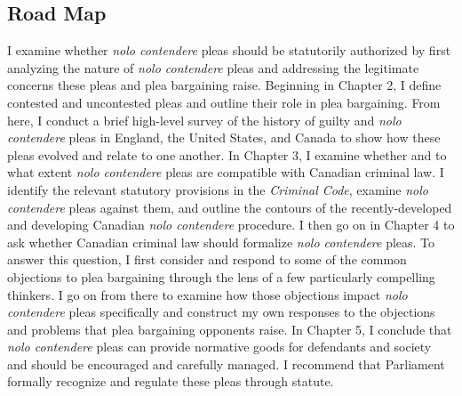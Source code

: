 \subsection{Road Map}

I examine whether \textit{nolo contendere} pleas should be statutorily authorized by first analyzing the nature of \textit{nolo contendere} pleas and addressing the legitimate concerns these pleas and plea bargaining raise. Beginning in Chapter 2, I define contested and uncontested pleas and outline their role in plea bargaining. From here, I conduct a brief high-level survey of the history of guilty and \textit{nolo contendere} pleas in England, the United States, and Canada to show how these pleas evolved and relate to one another. In Chapter 3, I examine whether and to what extent \textit{nolo contendere} pleas are compatible with Canadian criminal law. I identify the relevant statutory provisions in the \textit{Criminal Code}, examine \textit{nolo contendere} pleas against them, and outline the contours of the recently-developed and developing Canadian \textit{nolo contendere} procedure. I then go on in Chapter 4 to ask whether Canadian criminal law should formalize \textit{nolo contendere} pleas. To answer this question, I first consider and respond to some of the common objections to plea bargaining through the lens of a few particularly compelling thinkers. I go on from there to examine how those objections impact \textit{nolo contendere} pleas specifically and construct my own responses to the objections and problems that plea bargaining opponents raise. In Chapter 5, I conclude that \textit{nolo contendere} pleas can provide normative goods for defendants and society and should be encouraged and carefully managed. I recommend that Parliament formally recognize and regulate these pleas through statute.